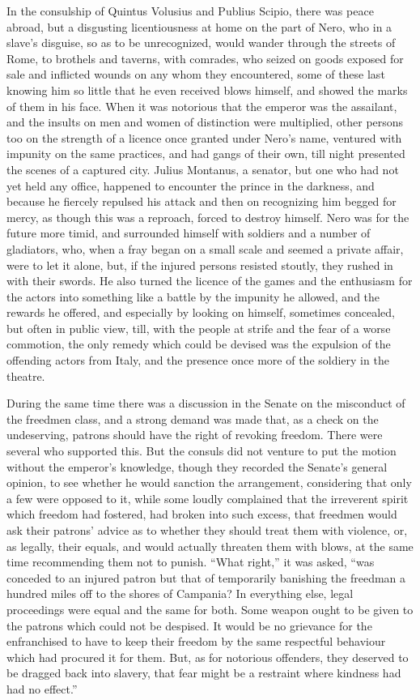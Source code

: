 In the consulship of Quintus Volusius and Publius Scipio, there was peace abroad, but a disgusting licentiousness at home on the part of Nero, who in a slave's disguise, so as to be unrecognized, would wander through the streets of Rome, to brothels and taverns, with comrades, who seized on goods exposed for sale and inflicted wounds on any whom they encountered, some of these last knowing him so little that he even received blows himself, and showed the marks of them in his face. When it was notorious that the emperor was the assailant, and the insults on men and women of distinction were multiplied, other persons too on the strength of a licence once granted under Nero's name, ventured with impunity on the same practices, and had gangs of their own, till night presented the scenes of a captured city. Julius Montanus, a senator, but one who had not yet held any office, happened to encounter the prince in the darkness, and because he fiercely repulsed his attack and then on recognizing him begged for mercy, as though this was a reproach, forced to destroy himself. Nero was for the future more timid, and surrounded himself with soldiers and a number of gladiators, who, when a fray began on a small scale and seemed a private affair, were to let it alone, but, if the injured persons resisted stoutly, they rushed in with their swords. He also turned the licence of the games and the enthusiasm for the actors into something like a battle by the impunity he allowed, and the rewards he offered, and especially by looking on himself, sometimes concealed, but often in public view, till, with the people at strife and the fear of a worse commotion, the only remedy which could be devised was the expulsion of the offending actors from Italy, and the presence once more of the soldiery in the theatre.


During the same time there was a discussion in the Senate on the misconduct of the freedmen class, and a strong demand was made that, as a check on the undeserving, patrons should have the right of revoking freedom. There were several who supported this. But the consuls did not venture to put the motion without the emperor's knowledge, though they recorded the Senate's general opinion, to see whether he would sanction the arrangement, considering that only a few were opposed to it, while some loudly complained that the irreverent spirit which freedom had fostered, had broken into such excess, that freedmen would ask their patrons' advice as to whether they should treat them with violence, or, as legally, their equals, and would actually threaten them with blows, at the same time recommending them not to punish. ``What right,'' it was asked, ``was conceded to an injured patron but that of temporarily banishing the freedman a hundred miles off to the shores of Campania? In everything else, legal proceedings were equal and the same for both. Some weapon ought to be given to the patrons which could not be despised. It would be no grievance for the enfranchised to have to keep their freedom by the same respectful behaviour which had procured it for them. But, as for notorious offenders, they deserved to be dragged back into slavery, that fear might be a restraint where kindness had had no effect.''

